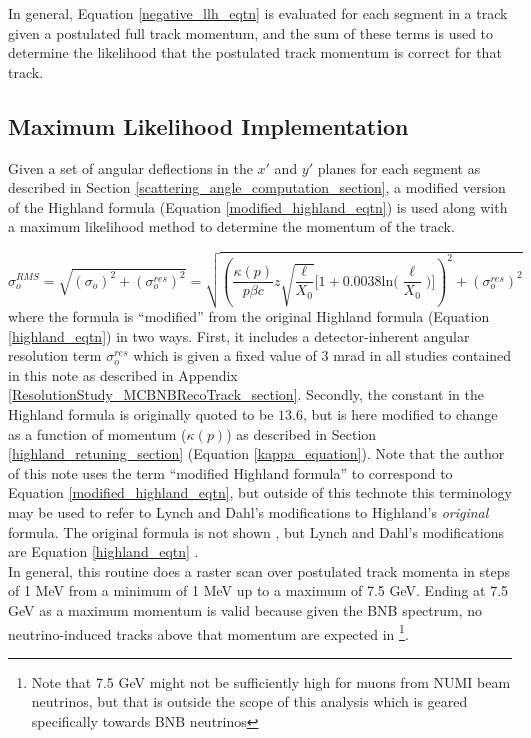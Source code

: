 In general, Equation \ref{negative_llh_eqtn} is evaluated for each segment in a track given a postulated full track momentum, and the sum of these terms is used to determine the likelihood that the postulated track momentum is correct for that track.

\subsection{Maximum Likelihood Implementation}\label{maximum_likelihood_section}

Given a set of angular deflections in the $x'$ and $y'$ planes for each segment as described in Section \ref{scattering_angle_computation_section}, a modified version of the Highland formula (Equation \ref{modified_highland_eqtn}) is used along with a maximum likelihood method to determine the momentum of the track. 

\begin{equation}\label{modified_highland_eqtn}
\sigma_{o}^{RMS} = \sqrt{ (\sigma_o)^2 + (\sigma_o^{res})^2} = \sqrt{ (\frac{\kappa(p)}{p\beta c}z\sqrt{\frac{\ell}{X_0}}\Big[1+0.0038\text{ln}\Big(\frac{\ell}{X_0}\Big)\Big])^2 + (\sigma_o^{res})^2 }
\end{equation}
where the formula is ``modified'' from the original Highland formula (Equation \ref{highland_eqtn}) in two ways. First, it includes a detector-inherent angular resolution term $\sigma_o^{res}$ which is given a fixed value of 3 mrad in all studies contained in this note as described in Appendix \ref{ResolutionStudy_MCBNBRecoTrack_section}\cite{leonidas2}. Secondly, the constant in the Highland formula is originally quoted to be $13.6$, but is here modified to change as a function of momentum ($\kappa(p)$) as described in Section \ref{highland_retuning_section} (Equation \ref{kappa_equation}). Note that the author of this note uses the term ``modified Highland formula'' to correspond to Equation \ref{modified_highland_eqtn}, but outside of this technote this terminology may be used to refer to Lynch and Dahl's modifications to Highland's \textit{original} formula. The original formula is not shown \cite{highland}, but Lynch and Dahl's modifications are Equation \ref{highland_eqtn} \cite{highland-lynch-dahl}.\\

In general, this routine does a raster scan over postulated track momenta in steps of 1 MeV from a minimum of 1 MeV up to a maximum of 7.5 GeV. Ending at 7.5 GeV as a maximum momentum is valid because given the BNB spectrum, no neutrino-induced tracks above that momentum are expected in {\ub}\footnote{Note that 7.5 GeV might not be sufficiently high for muons from NUMI beam neutrinos, but that is outside the scope of this analysis which is geared specifically towards BNB neutrinos}.\\

